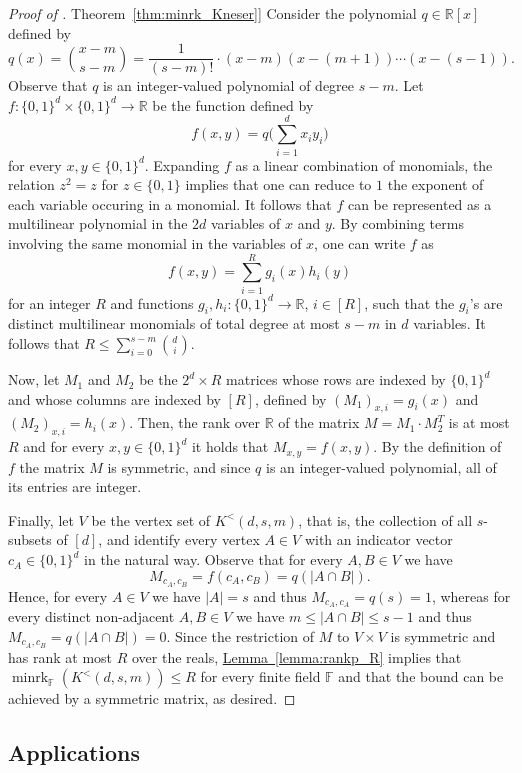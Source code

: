 \documentclass[11pt]{article}
\numberwithin{equation}{section}
\theoremstyle{definition}
\theoremstyle{plain}
\newcommand{\R}{\mathbb R}
\newcommand{\expref}[2]{\hyperref[#2]{#1~\ref{#2}}}
\newcommand{\Fset}{\mathbb{F}}
\newcommand{\minrank}{\mathop{\mathrm{minrk}}}
\newcommand\Kneser[3]{K^<(#1,#2,#3)}
\begin{document}
\begin{proof}[Proof of \expref{Theorem}{thm:minrk_Kneser}]
Consider the polynomial $q \in \R[x]$ defined by
\[q(x) = {\binom {x-m} {s-m}} = \frac{1}{(s-m)!} \cdot (x-m)(x-(m+1)) \cdots (x-(s-1)).\]
Observe that $q$ is an integer-valued polynomial of degree $s-m$.
%
%
Let $f: \{0,1\}^d \times \{0,1\}^d \rightarrow \R$ be the function defined by
\[ f(x,y) = q  \Big ( \sum_{i=1}^{d}{x_i y_i}\Big )\]
for every $x,y \in \{0,1\}^d$.
Expanding $f$ as a linear combination of monomials, the relation $z^2 = z$ for $z \in \{0,1\}$ implies that one can reduce to $1$ the exponent of each variable occuring in a monomial. It follows that $f$ can be represented as a multilinear polynomial in the $2d$ variables of $x$ and $y$. By combining terms involving the same monomial in the variables of $x$, one can write $f$ as
\[ f(x,y) = \sum_{i=1}^{R}{g_i(x) h_i(y)} \]
for an integer $R$ and functions $g_i, h_i : \{0,1\}^d \rightarrow \R$, $i \in [R]$, such that the $g_i$'s are distinct multilinear monomials of total degree at most $s-m$ in $d$ variables. It follows that $R \leq \sum_{i=0}^{s-m}\binom{d}{i}$.

Now, let $M_1$ and $M_2$ be the $2^d \times R$ matrices whose rows are indexed by $\{0,1\}^d$ and whose columns are indexed by $[R]$, defined by $(M_1)_{x,i} = g_i(x)$ and $(M_2)_{x,i} = h_i(x)$. Then, the rank over $\R$ of the matrix $M = M_1 \cdot M_2^T$ is at most $R$ and for every $x,y \in\{0,1\}^d$ it holds that $M_{x,y} = f(x,y)$. By the definition of $f$ the matrix $M$ is symmetric, and since $q$ is an integer-valued polynomial, all of its entries are integer.

Finally, let $V$ be the vertex set of $\Kneser{d}{s}{m}$, that is, the collection of all $s$-subsets of $[d]$, and identify every vertex $A \in V$ with an indicator vector $c_A \in \{0,1\}^d$ in the natural way.
Observe that for every $A,B \in V$ we have
\[M_{c_A, c_B} = f(c_A,c_B) = q(|A \cap B|).\]
Hence, for every $A \in V$ we have $|A|=s$ and thus $M_{c_A,c_A} =q(s) = 1$, whereas for every distinct non-adjacent $A,B \in V$ we have $m \leq |A \cap B|\leq s-1$ and thus $M_{c_A,c_B} = q(|A \cap B|) =0$.
Since the restriction of $M$ to $V \times V$ is symmetric and has rank at most $R$ over the reals, \expref{Lemma}{lemma:rankp_R} implies that ${\minrank}_{\Fset}(\Kneser{d}{s}{m}) \leq R$ for every finite field $\Fset$ and that the bound can be achieved by a symmetric matrix, as desired.
\end{proof}


\subsection{Applications}
\end{document}
